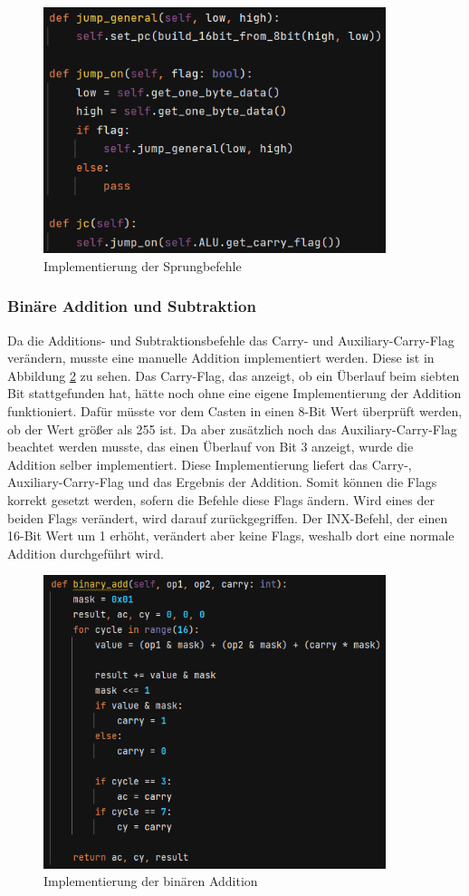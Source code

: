 \documentclass[12pt]{article}
\newcommand{\imgSpaceBefore}{\vspace{10pt}}
\begin{document}
\imgSpaceBefore
\begin{figure}[H]
\centering
\includegraphics[width=10cm]{Bilder/JumpVariants}
\caption{Implementierung der Sprungbefehle}
\label{fig:JumpVariants}
\end{figure}


\subsubsection{Binäre Addition und Subtraktion}
Da die Additions- und Subtraktionsbefehle das Carry- und Auxiliary-Carry-Flag verändern, musste eine manuelle Addition implementiert werden. Diese ist in Abbildung \ref{fig:binaere_addition} zu sehen. Das Carry-Flag, das anzeigt, ob ein Überlauf beim siebten Bit stattgefunden hat, hätte noch ohne eine eigene Implementierung der Addition funktioniert. Dafür müsste vor dem Casten in einen 8-Bit Wert überprüft werden, ob der Wert größer als 255 ist. Da aber zusätzlich noch das Auxiliary-Carry-Flag beachtet werden musste, das einen Überlauf von Bit 3 anzeigt, wurde die Addition selber implementiert. Diese Implementierung liefert das Carry-, Auxiliary-Carry-Flag und das Ergebnis der Addition. Somit können die Flags korrekt gesetzt werden, sofern die Befehle diese Flags ändern. Wird eines der beiden Flags verändert, wird darauf zurückgegriffen. Der INX-Befehl, der einen 16-Bit Wert um 1 erhöht, verändert aber keine Flags, weshalb dort eine normale Addition durchgeführt wird.

\imgSpaceBefore
\begin{figure}[H]
\centering
\includegraphics[width=10cm]{Bilder/binaere_addition}
\caption{Implementierung der binären Addition}
\label{fig:binaere_addition}
\end{figure}
\end{document}
